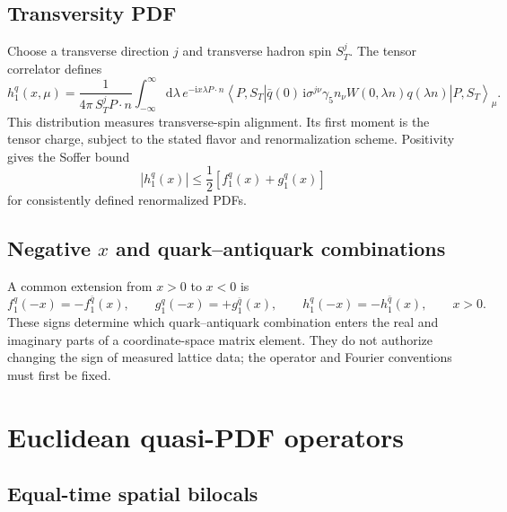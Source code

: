 \documentclass[11pt]{article}
\numberwithin{equation}{section}
\newcommand{\ii}{\mathrm{i}}
\newcommand{\dd}{\mathrm{d}}
\newcommand{\avg}[1]{\left\langle #1\right\rangle}
\begin{document}
\subsection{Transversity PDF}

Choose a transverse direction $j$ and transverse hadron spin $S_T^j$.
The tensor correlator defines
\begin{equation}
  h_1^q(x,\mu)
  =\frac{1}{4\pi\,S_T^j P\cdot n}
   \int_{-\infty}^{\infty}\dd\lambda\,
   e^{-\ii x\lambda P\cdot n}
   \avg{P,S_T|\bar q(0)\,
   \ii\sigma^{j\nu}\gamma_5 n_\nu
   W(0,\lambda n)q(\lambda n)|P,S_T}_{\mu}.
  \label{eq:h1-definition}
\end{equation}
This distribution measures transverse-spin alignment.  Its first moment is
the tensor charge, subject to the stated flavor and renormalization scheme.
Positivity gives the Soffer bound
\begin{equation}
  |h_1^q(x)|\leq\frac{1}{2}\left[f_1^q(x)+g_1^q(x)\right]
  \label{eq:soffer}
\end{equation}
for consistently defined renormalized PDFs.

\subsection{Negative \texorpdfstring{$x$}{x} and quark--antiquark combinations}

A common extension from $x>0$ to $x<0$ is
\begin{equation}
  f_1^q(-x)=-f_1^{\bar q}(x),\qquad
  g_1^q(-x)=+g_1^{\bar q}(x),\qquad
  h_1^q(-x)=-h_1^{\bar q}(x),
  \qquad x>0.
  \label{eq:negative-x}
\end{equation}
These signs determine which quark--antiquark combination enters the real and
imaginary parts of a coordinate-space matrix element.  They do not authorize
changing the sign of measured lattice data; the operator and Fourier
conventions must first be fixed.

\section{Euclidean quasi-PDF operators}

\subsection{Equal-time spatial bilocals}
\end{document}
